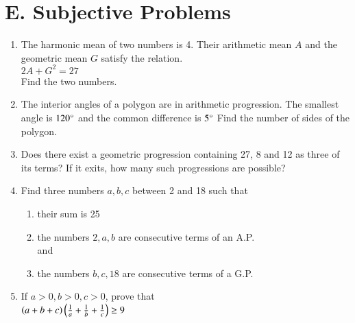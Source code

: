 \documentclass[journal]{IEEEtran}
\theoremstyle{remark}
\begin{document}
\section*{E. Subjective Problems}
\begin{enumerate}
    \item The harmonic mean of two numbers is 4. Their arithmetic mean $A$ and the geometric mean $G$ satisfy the relation.
    \\
    $2A + G^2 = 27$
    \\
    Find the two numbers.  \hfill{}

\item The interior angles of a polygon are in arithmetic progression. The smallest angle is $120\degree$ and the common difference is $5\degree$ Find the number of sides of the polygon.

\hfill{}

    \item Does there exist a geometric progression containing 27, 8 and 12 as three of its terms? If it exits, how many such progressions are possible?  \hfill{}

    \item Find three numbers $a,b,c$ between 2 and 18 such that
    \begin{enumerate}
    \item their sum is 25
    \item the numbers $2,a,b$ are consecutive terms of an A.P.
    \\
    and
    \item the numbers $b,c,18$ are consecutive terms of a G.P.\hfill{}
    \end{enumerate}
  

    \item If $a>0,b>0,c>0$, prove that
    \\
    $\left(a+b+c\right)\left(\frac{1}{a}+\frac{1}{b}+\frac{1}{c}\right)\geq9$
    \hfill{}

\end{enumerate}
\end{document}

